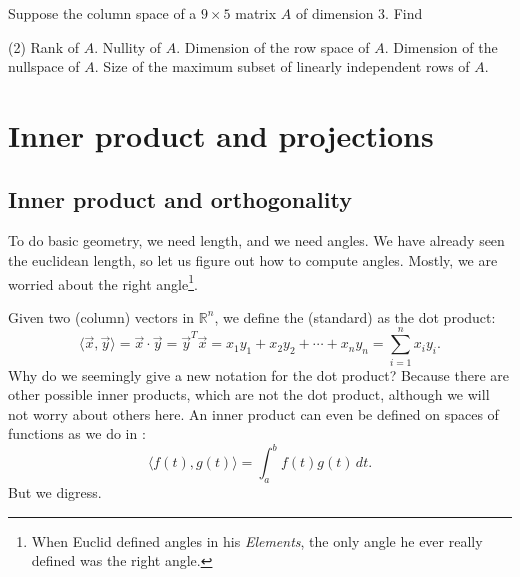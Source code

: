 \begin{exercise}
Suppose the column space of a $9 \times 5$ matrix $A$ of dimension 3.  Find
\begin{tasks}(2)
\task
Rank of $A$.
\task
Nullity of $A$.
\task
Dimension of the row space of $A$.
\task
Dimension of the nullspace of $A$.
\task
Size of the maximum subset of
linearly independent rows of $A$.
\end{tasks}
\end{exercise}


\sectionnewpage
\section{Inner product and projections}
\label{innerproduct:section}


\subsection{Inner product and orthogonality}

To do basic geometry, we need length, and we need angles.
We have already seen the euclidean length, so let us figure out how to
compute angles. 
 Mostly, we are worried about 
the right angle\footnote{When Euclid defined angles in his
\emph{Elements}, the only angle he ever really defined was the right angle.}.

Given two (column) vectors in ${\mathbb{R}}^n$,
we define the (standard)
\emph{} as
the dot product:
\begin{equation*}
\langle \vec{x} , \vec{y} \rangle =
\vec{x} \cdot \vec{y}
=
\vec{y}^T \vec{x}
=
x_1 y_1 + x_2 y_2 + \cdots + x_n y_n
=
\sum_{i=1}^n x_i y_i .
\end{equation*}
Why do we seemingly give a new notation for the dot product?  
Because there are other possible inner products, which are not the dot
product, although we will not worry about others here.
An inner product can even be defined on spaces of functions
as we do in
:
\begin{equation*}
\langle f(t) , g(t) \rangle =
\int_{a}^{b}
f(t) g(t) \, dt .
\end{equation*}
But we digress.

